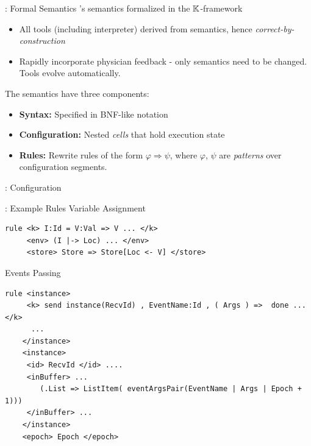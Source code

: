 \documentclass{beamer}
\begin{document}
\begin{frame}[fragile]{\MediK{}: Formal Semantics}
  \MediK{}'s semantics formalized in the $\mathbb{K}{}$-framework
  \begin{itemize}
    \item All tools (including interpreter) derived from semantics,
      hence \emph{correct-by-construction}
    \item Rapidly incorporate physician feedback - only
      semantics need to be changed. Tools evolve automatically.
  \end{itemize}
  \pause
  The semantics have three components:
  \begin{itemize}
    \item \textbf{Syntax:} Specified in BNF-like notation
    \item \textbf{Configuration:} Nested \emph{cells} that hold execution state
    \item \textbf{Rules:} Rewrite rules of the form $\varphi \Rightarrow \psi$,
      where $\varphi$, $\psi$ are \emph{patterns} over configuration segments.
  \end{itemize}
\end{frame}
\begin{frame}[fragile]{\MediK{}: Configuration}
  
\end{frame}
\begin{frame}[fragile]{\MediK{}: Example Rules}
  Variable Assignment
  \begin{lstlisting}[language=k,style=ksty,basicstyle=\ttfamily\tiny]
rule <k> I:Id = V:Val => V ... </k>
     <env> (I |-> Loc) ... </env>
     <store> Store => Store[Loc <- V] </store>
  \end{lstlisting}
  \pause
  Events Passing
  \begin{lstlisting}[language=k,style=ksty,basicstyle=\ttfamily\tiny]
rule <instance>
     <k> send instance(RecvId) , EventName:Id , ( Args ) =>  done ... </k>
      ...
    </instance>
    <instance>
     <id> RecvId </id> ....
     <inBuffer> ...
        (.List => ListItem( eventArgsPair(EventName | Args | Epoch + 1)))
     </inBuffer> ...
    </instance>
    <epoch> Epoch </epoch>
  \end{lstlisting}
\end{frame}
\end{document}
